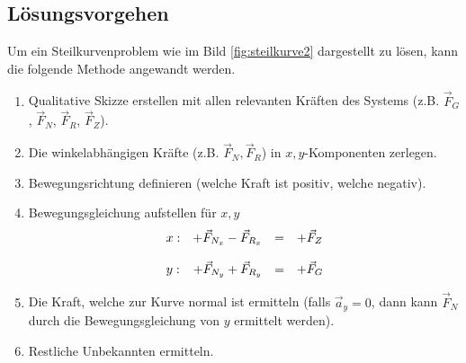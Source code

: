 \subsection{Lösungsvorgehen}
Um ein Steilkurvenproblem wie im Bild \ref{fig:steilkurve2} dargestellt
zu lösen, kann die folgende Methode angewandt werden.

\begin{enumerate}
	\item Qualitative Skizze erstellen mit allen relevanten Kräften
		des Systems (z.B. $\vec{F}_G$, $\vec{F}_N$, $\vec{F}_R$, 
		$\vec{F}_Z$).
	\item Die winkelabhängigen Kräfte (z.B. $\vec{F}_N, \vec{F}_R$) 
		in $x,y$-Komponenten zerlegen.
	\item Bewegungsrichtung definieren (welche Kraft ist positiv, 
		welche negativ).
	\item Bewegungsgleichung aufstellen für $x,y$
\[\begin{array}{l r c l}
	x: &
		+ \vec{F}_{N_x} - \vec{F}_{R_x} &=& + \vec{F}_Z \\
	& & & \\
	y: &
		+ \vec{F}_{N_y} + \vec{F}_{R_y} &=& + \vec{F}_G
\end{array} \]

	\item Die Kraft, welche zur Kurve normal ist ermitteln (falls
		$\vec{a}_y=0$, dann kann $\vec{F}_N$ durch die
		Bewegungsgleichung von $y$ ermittelt werden).
	\item Restliche Unbekannten ermitteln.
\end{enumerate}
